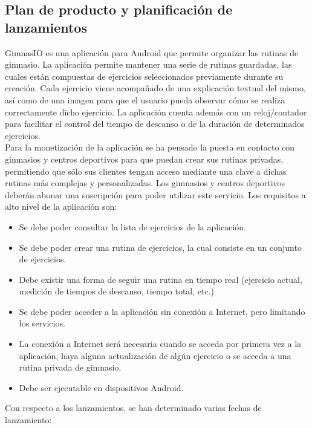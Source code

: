 \documentclass[11pt,a4paper]{report}
\begin{document}
\subsection{Plan de producto y planificación de lanzamientos}\label{s:prod1}
GimnasIO es una aplicación para Android que permite organizar las rutinas de gimnasio. La aplicación permite mantener una serie de rutinas guardadas, las cuales están compuestas de ejercicios seleccionados previamente durante su creación. Cada ejercicio viene acompañado de una explicación textual del mismo, así como de una imagen para que el usuario pueda observar cómo se realiza correctamente dicho ejercicio. La aplicación cuenta además con un reloj/contador para facilitar el control del tiempo de descanso o de la duración de determinados ejercicios.
\\Para la monetización de la aplicación se ha pensado la puesta en contacto con gimnasios y centros deportivos para que puedan crear sus rutinas privadas, permitiendo que sólo sus clientes tengan acceso mediante una clave a dichas rutinas más complejas y personalizadas. Los gimnasios y centros deportivos deberán abonar una suscripción para poder utilizar este servicio.
\newline Los requisitos a alto nivel de la aplicación son:
\begin{itemize}
	\item Se debe poder consultar la lista de ejercicios de la aplicación.
	\item Se debe poder crear una rutina de ejercicios, la cual consiste en un conjunto de ejercicios.
	\item Debe existir una forma de seguir una rutina en tiempo real (ejercicio actual, medición de tiempos de
	descanso, tiempo total, etc.)
	\item Se debe poder acceder a la aplicación sin conexión a Internet, pero limitando los servicios.
	\item La conexión a Internet será necesaria cuando se acceda por primera vez a la aplicación, haya alguna
	actualización de algún ejercicio o se acceda a una rutina privada de gimnasio.	
	\item Debe ser ejecutable en dispositivos Android.
\end{itemize}
Con respecto a los lanzamientos, se han determinado varias fechas de lanzamiento:
\end{document}
